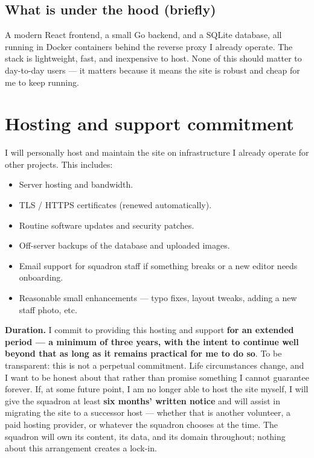 \documentclass[11pt,letterpaper]{article}
\begin{document}
\subsection{What is under the hood (briefly)}
A modern React frontend, a small Go backend, and a SQLite database, all running in Docker containers behind the reverse proxy I already operate. The stack is lightweight, fast, and inexpensive to host. None of this should matter to day-to-day users --- it matters because it means the site is robust and cheap for me to keep running.

\section{Hosting and support commitment}\label{sec:commitment}

I will personally host and maintain the site on infrastructure I already operate for other projects. This includes:

\begin{itemize}[leftmargin=1.4em,itemsep=0.25em]
  \item Server hosting and bandwidth.
  \item TLS / HTTPS certificates (renewed automatically).
  \item Routine software updates and security patches.
  \item Off-server backups of the database and uploaded images.
  \item Email support for squadron staff if something breaks or a new editor needs onboarding.
  \item Reasonable small enhancements --- typo fixes, layout tweaks, adding a new staff photo, etc.
\end{itemize}

\textbf{Duration.} I commit to providing this hosting and support \textbf{for an extended period --- a minimum of three years, with the intent to continue well beyond that as long as it remains practical for me to do so}. To be transparent: this is not a perpetual commitment. Life circumstances change, and I want to be honest about that rather than promise something I cannot guarantee forever. If, at some future point, I am no longer able to host the site myself, I will give the squadron at least \textbf{six months' written notice} and will assist in migrating the site to a successor host --- whether that is another volunteer, a paid hosting provider, or whatever the squadron chooses at the time. The squadron will own its content, its data, and its domain throughout; nothing about this arrangement creates a lock-in.
\end{document}
